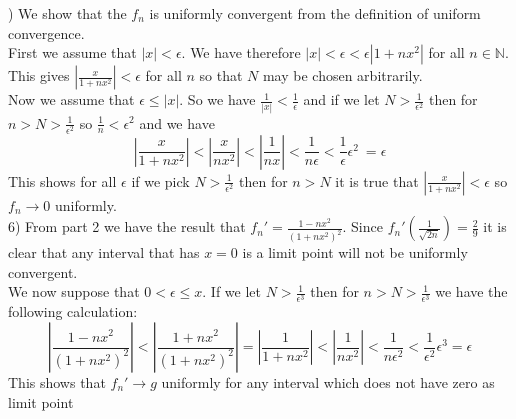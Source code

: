 \documentclass[11pt,reqno]{article}
\begin{document}
) We show that the $f_n$ is uniformly convergent from the definition of uniform convergence.\\
\indent First we assume that $|x| < \epsilon$. We have therefore $|x| < \epsilon < \epsilon |1 + n x^2|$ for all $n \in \mathbb{N}$. This gives $|\frac{x}{1+nx^2}| < \epsilon$ for all $n$ so that $N$ may be chosen arbitrarily.\\
\indent Now we assume that $\epsilon \le |x|$. So we have $\frac{1}{|x|} < \frac{1}{\epsilon}$ and if we let $N > \frac{1}{\epsilon^2}$ then for $n > N > \frac{1}{\epsilon^2}$ so $ \frac{1}{n} < \epsilon^2$ and we have
\[ |\frac{x}{1 + nx^2}| < |\frac{x}{nx^2}| < |\frac{1}{nx}| < \frac{1}{n\epsilon} <  \frac{1}{\epsilon} \epsilon^2\ = \epsilon \]
This shows for all $\epsilon$ if we pick $N > \frac{1}{\epsilon^2}$ then for $n > N$ it is true that 
$|\frac{x}{1+nx^2}| < \epsilon$ so $f_n \to 0$ uniformly.\\
6) From part 2 we have the result that $f_n' = \frac{1- nx^2}{(1+nx^2)^2}$. Since $f_n'(\frac{1}{\sqrt{2n}}) = \frac{2}{9}$ it is clear that any interval that has $x = 0$ is a limit point will not be uniformly convergent.\\
\indent We now suppose that $0 < \epsilon \le x$. If we let $N  > \frac{1}{\epsilon^3}$ then for $n > N > \frac{1}{\epsilon^3}$ we have the following calculation:
\[ |\frac{1-nx^2}{(1+nx^2)^2}| <  |\frac{1 + nx^2}{(1+nx^2)^2}| = |\frac{1}{1 + nx^2}| < |\frac{1}{nx^2}| <  \frac{1}{n\epsilon^2} < \frac{1}{\epsilon^2} \epsilon^3 = \epsilon \]
This shows that $f_n' \to g$ uniformly for any interval which does not have zero as limit point
\end{document}

